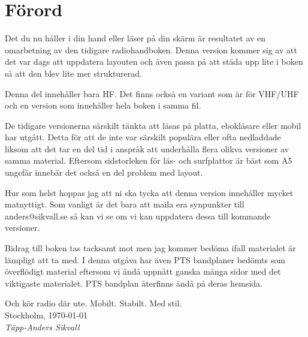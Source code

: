 \section*{Förord}

Det du nu håller i din hand eller läser på din skärm är resultatet av en omarbetning av den tidigare radiohandboken. Denna version kommer sig av att det var dags att uppdatera layouten och även passa på att städa upp lite i boken så att den blev lite mer strukturerad.

Denna del innehåller bara HF. Det finns också en variant som är för VHF/UHF och en version som innehåller hela boken i samma fil.

De tidigare versionerna särskilt tänkta att läsas på platta, ebokläsare eller mobil har utgått. Detta för att de inte var särskilt populära eller ofta nedladdade liksom att det tar en del tid i anspråk att underhålla flera olikva versioner av samma material. Eftersom sidstorleken för läs- och surfplattor är bäst som A5 ungefär innebär det också en del problem med layout.

Hur som helst hoppas jag att ni ska tycka att denna version innehåller mycket matnyttigt. Som vanligt är det bara att maila era synpunkter till anders@sikvall.se så kan vi se om vi kan uppdatera dessa till kommande versioner.

Bidrag till boken tas tacksamt mot men jag kommer bedöma ifall materialet är lämpligt att ta med. I denna utgåva har även PTS bandplaner bedömts som överflödigt material eftersom vi ändå uppnått ganska många sidor med det viktigaste materialet. PTS bandplan återfinns ändå på deras hemsida.

Och kör radio där ute. Mobilt. Stabilt. Med stil.\\[4em]

Stockholm, \today\\
\textit{Täpp-Anders Sikvall}

\clearpage